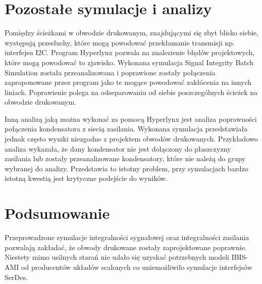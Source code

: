 





\section{Pozostałe symulacje i analizy}
Pomiędzy ścieżkami w obwodzie drukowanym, znajdującymi się zbyt blisko siebie, występują przesłuchy, które mogą powodować przekłamanie transmisji np. interfejsu I2C. Program Hyperlynx pozwala na znalezienie błędów projektowych, które mogą powodować to zjawisko. Wykonana symulacja Signal Integrity Batch Simulation została przeanalizowana i poprawione zostały połączenia zaproponowane przez program jako te mogące powodować zakłócenia na innych liniach. Poprawienie polega na odseparowaniu od siebie poszczególnych ścieżek na obwodzie drukowanym.  

Inną analizą jaką można wykonać za pomocą Hyperlynx jest analiza poprawności połączenia kondensatora z siecią zasilania. Wykonana symulacja przedstawiała jednak często wyniki niezgodne z projektem obwodów drukowanych. Przykładowo analiza wykazała, że dany kondensator nie jest dołączony do płaszczyzny zasilania lub zostały przeanalizowane kondensatory, które nie należą do grupy wybranej do analizy. Przedstawia to istotny problem, przy symulacjach bardzo istotną kwestią jest krytyczne podejście do wyników. 

\section{Podsumowanie}
Przeprowadzone symulacje integralności sygnałowej oraz integralności zasilania pozwalają zakładać, że obwody drukowane zostały zaprojektowane poprawnie. Niestety mimo usilnych starań nie udało się uzyskać potrzebnych modeli IBIS-AMI od producentów układów scalonych co uniemożliwiło symulacje interfejsów SerDes.


